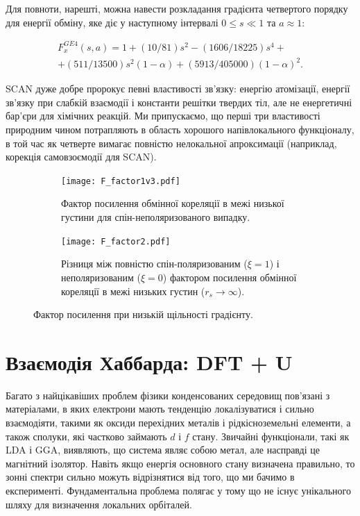 Для повноти, нарешті, можна навести розкладання градієнта четвертого порядку для енергії обміну, яке діє у наступному інтервалі $0 \leq s \ll 1$ та $a \approx 1:$

\begin{eqnarray}
	F_x^{GE4}(s,a) = 1+(10/81)s^2 - (1606/18225)s^4 +\nonumber \\
 + (511/13500)s^2(1-\alpha) + (5913/405000)(1-\alpha)^2.      
\end{eqnarray}

SCAN дуже добре пророкує певні властивості зв'язку: енергію атомізації, енергії зв'язку при слабкій взаємодії і константи решітки твердих тіл, але не енергетичні бар'єри для хімічних реакцій. Ми припускаємо, що перші три властивості природним чином потрапляють в область хорошого напівлокального функціоналу, в той час як четверте вимагає повністю нелокальної апроксимації (наприклад, корекція самовзоємодії для SCAN).
 
\begin{figure}[H]
\centering
\label{fig:F_factor}
	\begin{subfigure}{.9\textwidth}
		\hspace*{-1.2cm}
    	\texttt{[image: F\_factor1v3.pdf]}
    	\caption{Фактор посилення обмінної кореляції в межі низької густини для спін-неполяризованого випадку.}
    	\label{fig:sub1}	
	\end{subfigure}
	
	\begin{subfigure}{.9\textwidth}
		\hspace*{0.15cm}
    	\texttt{[image: F\_factor2.pdf]}
    	\caption{
    	Різниця між повністю спін-поляризованим ($\xi = 1$) і неполяризованим ($\xi = 0$) фактором посилення обмінної кореляції в межі низьких густин ($r_s \rightarrow \infty$).}
    	\label{fig:sub1}	
	\end{subfigure}
\caption{Фактор посилення при низькій щільності градієнту.}
\end{figure}

\section{Взаємодія Хаббарда: DFT + U}
Багато з найцікавіших проблем фізики конденсованих середовищ пов'язані з матеріалами, в яких електрони мають тенденцію локалізуватися і сильно взаємодіяти, такими як оксиди перехідних металів і рідкісноземельні елементи, а також сполуки, які частково займають $d$ і $f$ стану. Звичайні функціонали, такі як LDA і GGA, виявляють, що система являє собою метал, але насправді це магнітний ізолятор. Навіть якщо енергія основного стану визначена правильно, то зонні спектри сильно можуть відрізнятися від того, що ми бачимо в експерименті. Фундаментальна проблема полягає у тому що не існує унікального шляху для визначення локальних орбіталей. 


